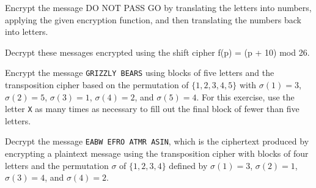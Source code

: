 \documentclass{exam}
\begin{document}
\begin{questions}

\question
Encrypt the message DO NOT PASS GO by translating the letters into numbers, applying the given encryption function, and then translating the numbers back into
letters.



\question Decrypt these messages encrypted using the shift cipher
f(p) = (p + 10) mod 26.

\newpage


\question
Encrypt the message \texttt{GRIZZLY BEARS} using blocks of five letters and the transposition cipher based on the permutation of $\{1, 2, 3, 4, 5\}$ with $\sigma(1) = 3$, $\sigma(2) = 5$, $\sigma(3) = 1$, $\sigma(4) = 2$, and $\sigma(5) = 4$. For this exercise, use the letter \texttt{X} as many times as necessary to fill out the final block of fewer than five letters.
\newpage

\question
Decrypt the message \texttt{EABW EFRO ATMR ASIN}, which is the ciphertext produced by encrypting a plaintext message using the transposition cipher with blocks of four letters and the permutation $\sigma$ of $\{1, 2, 3, 4\}$ defined by $\sigma(1) = 3$, $\sigma(2) = 1$, $\sigma(3) = 4$, and $\sigma(4) = 2$.
\newpage

\end{questions}
\end{document}

